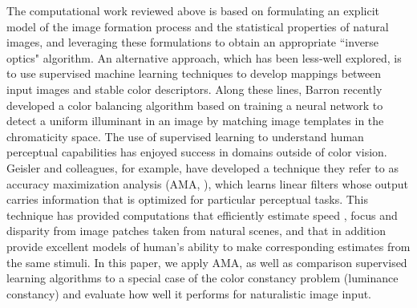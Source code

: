 \documentclass{jov}
\begin{document}
The computational work reviewed above is based on formulating an explicit model of the image formation process and the statistical properties of natural images, and leveraging these formulations to obtain an appropriate ``inverse optics" algorithm.  An alternative approach, which has been less-well explored, is to use supervised machine learning techniques to develop mappings between input images and stable color descriptors.  Along these lines, Barron \cite{barron2015convolutional} recently developed a color balancing algorithm based on training a neural network to detect a uniform illuminant in an image by matching image templates in the chromaticity space. The use of supervised learning to understand human perceptual capabilities has enjoyed success in domains outside of color vision. Geisler and colleagues, for example, have developed a technique they refer to as accuracy maximization analysis (AMA, ), which learns linear filters whose output carries information that is optimized for particular perceptual tasks. This technique has provided computations that efficiently estimate speed \cite{burge2015optimal}, focus \cite{burge2011optimal} and disparity \cite{burge2014optimal} from image patches taken from natural scenes, and that in addition provide excellent models of human's ability to make corresponding estimates from the same stimuli.  In this paper, we apply AMA, as well as comparison supervised learning algorithms to a special case of the color constancy problem (luminance constancy) and evaluate how well it performs for naturalistic image input. 
\end{document}

